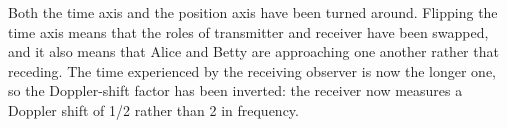 Both the time axis and the position axis have been turned around. Flipping the time axis
means that the roles of transmitter and receiver have been swapped, and it also means
that Alice and Betty are approaching one another rather that receding. The time experienced
by the receiving observer is now the longer one, so the Doppler-shift factor has been
inverted: the receiver now measures a Doppler shift of 1/2 rather than 2 in frequency.


